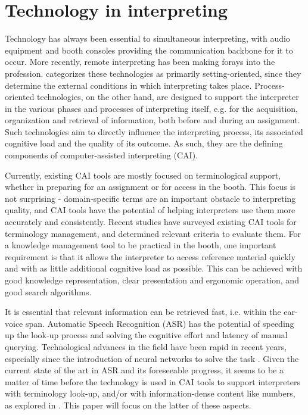 \documentclass[output=paper]{langsci/langscibook}
\begin{document}
\section{Technology in interpreting}

Technology has always been essential to simultaneous interpreting, with audio equipment and booth consoles providing the communication backbone for it to occur. More recently, remote interpreting has been making forays into the profession. \citet{Fantinuoli2018} categorizes these technologies as primarily setting-oriented, since they determine the external conditions in which interpreting takes place. Process-oriented technologies, on the other hand, are designed to support the interpreter in the various phases and processes of interpreting itself, e.g. for the acquisition, organization and retrieval of information, both before and during an assignment. Such technologies aim to directly influence the interpreting process, its associated cognitive load and the quality of its outcome. As such, they are the defining components of computer-assisted interpreting (CAI).

Currently, existing CAI tools are mostly focused on terminological support, whether in preparing for an assignment or for access in the booth. This focus is not surprising - domain-specific terms are an important obstacle to interpreting quality, and CAI tools have the potential of helping interpreters use them more accurately and consistently. Recent studies \citep{Will2015,Fantinuoli2017a,Costa2018} have surveyed existing CAI tools for terminology management, and determined relevant criteria to evaluate them. For a knowledge management tool to be practical in the booth, one important requirement is that it allows the interpreter to access reference material quickly and with as little additional cognitive load as possible. This can be achieved with good knowledge representation, clear presentation and ergonomic operation, and good search algorithms.

It is essential that relevant information can be retrieved fast, i.e. within the ear-voice span. Automatic Speech Recognition (\textsc{ASR}) has the potential of speeding up the look-up process and solving the cognitive effort and latency of manual querying. Technological advances in the field have been rapid in recent years, especially since the introduction of neural networks to solve the task \citep{Yu2016}. Given the current state of the art in \textsc{ASR} and its foreseeable progress, it seems to be a matter of time before the technology is used in \textsc{CAI} tools to support interpreters with terminology look-up, and/or with information-dense content like numbers, as explored in \citet{Fantinuoli2017b}. This paper will focus on the latter of these aspects. 
\end{document}
